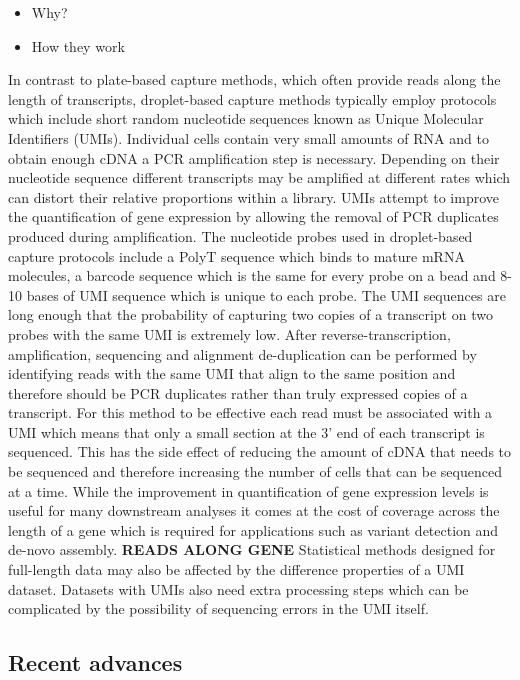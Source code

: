 \documentclass[11pt,a4paper,titlepage,twoside,openright]{style/unimelbthesis}
\theoremstyle{definition}
\theoremstyle{definition}
\theoremstyle{definition}
\theoremstyle{remark}
\begin{document}
\begin{mainmatter}
\begin{itemize}
\tightlist
\item
  Why?
\item
  How they work
\end{itemize}

In contrast to plate-based capture methods, which often provide reads along the length of transcripts, droplet-based capture methods typically employ protocols which include short random nucleotide sequences known as Unique Molecular Identifiers (UMIs). Individual cells contain very small amounts of RNA and to obtain enough cDNA a PCR amplification step is necessary. Depending on their nucleotide sequence different transcripts may be amplified at different rates which can distort their relative proportions within a library. UMIs attempt to improve the quantification of gene expression by allowing the removal of PCR duplicates produced during amplification. The nucleotide probes used in droplet-based capture protocols include a PolyT sequence which binds to mature mRNA molecules, a barcode sequence which is the same for every probe on a bead and 8-10 bases of UMI sequence which is unique to each probe. The UMI sequences are long enough that the probability of capturing two copies of a transcript on two probes with the same UMI is extremely low. After reverse-transcription, amplification, sequencing and alignment de-duplication can be performed by identifying reads with the same UMI that align to the same position and therefore should be PCR duplicates rather than truly expressed copies of a transcript. For this method to be effective each read must be associated with a UMI which means that only a small section at the 3' end of each transcript is sequenced. This has the side effect of reducing the amount of cDNA that needs to be sequenced and therefore increasing the number of cells that can be sequenced at a time. While the improvement in quantification of gene expression levels is useful for many downstream analyses it comes at the cost of coverage across the length of a gene which is required for applications such as variant detection and de-novo assembly. \textbf{READS ALONG GENE} Statistical methods designed for full-length data may also be affected by the difference properties of a UMI dataset. Datasets with UMIs also need extra processing steps which can be complicated by the possibility of sequencing errors in the UMI itself.

\hypertarget{recent-advances}{%
\subsection{Recent advances}\label{recent-advances}}


\end{mainmatter}
\end{document}

